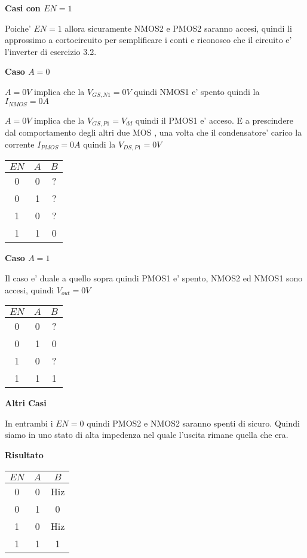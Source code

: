 \documentclass[\main/main.tex]{subfiles}
\begin{document}
\textbf{Casi con $EN = 1$}

Poiche' $EN = 1$ allora sicuramente NMOS2 e PMOS2 saranno accesi, quindi li approssimo a cortocircuito per semplificare i conti e riconosco che il circuito e' l'inverter di esercizio 3.2.

\textbf{Caso $A = 0$}

$A = 0V$ implica che la $V_{GS,N1} = 0V$ quindi NMOS1 e' spento quindi la $I_{NMOS}  = 0A$

$A = 0V$ implica che la $V_{GS,P1} = V_{dd}$ quindi il PMOS1 e' acceso.
E a prescindere dal comportamento degli altri due MOS , una volta che il condensatore' carico la corrente $I_{PMOS} = 0A$ quindi la $V_{DS,P1} = 0V$
\begin{center}
\begin{tabular}{ c  c | c}
  $EN$ & $A$ & $B$\\
  \hline				
  0 & 0 & ?\\	
  0 & 1 & ?\\	
  1 & 0 & ?\\ 	
  1 & 1 & 0\\ 
\end{tabular}
\end{center}

\textbf{Caso  $A = 1$}

Il caso e' duale a quello sopra quindi PMOS1 e' spento, NMOS2 ed NMOS1 sono accesi, quindi $V_{out} = 0V$

\begin{center}
\begin{tabular}{ c  c | c}
  $EN$ & $A$ & $B$\\
  \hline				
  0 & 0 & ?\\	
  0 & 1 & 0\\	
  1 & 0 & ?\\ 	
  1 & 1 & 1\\ 
\end{tabular}
\end{center}

\textbf{Altri Casi}

In entrambi i $EN = 0$ quindi PMOS2 e NMOS2 saranno spenti di sicuro.
Quindi siamo in uno stato di alta impedenza nel quale l'uscita rimane quella che era.

\textbf{Risultato}
\begin{center}
\begin{tabular}{ c  c | c}
  $EN$ & $A$ & $B$\\
  \hline				
  0 & 0 & Hiz\\	
  0 & 1 & 0\\	
  1 & 0 & Hiz\\ 	
  1 & 1 & 1\\ 
\end{tabular}
\end{center}
\end{document}
